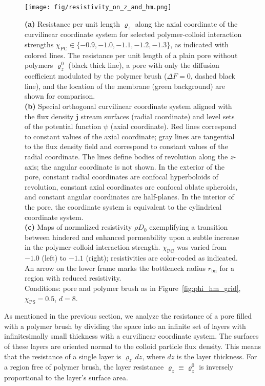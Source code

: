 \documentclass[12pt, a4paper]{article}
\begin{document}
\begin{figure}
    \centering
    \texttt{[image: fig/resistivity\_on\_z\_and\_hm.png]}
    \caption{
    \textbf{(a)} Resistance per unit length $\varrho_{z}$ along the axial coordinate of the curvilinear coordinate system for selected polymer-colloid interaction strengths $\chi_{\text{PC}} \in \{ -0.9, -1.0, -1.1, -1.2, -1.3\}$, as indicated with colored lines.
    The resistance per unit length of a plain pore without polymers $\varrho_{z}^{0}$ (black thick line), a pore with only the diffusion coefficient modulated by the polymer brush ($\Delta F = 0$, dashed black line), and the location of the membrane (green background) are shown for comparison.
    \\
    \textbf{(b)} Special orthogonal curvilinear coordinate system aligned with the flux density $\bm{j}$ stream surfaces (radial coordinate) and level sets of the potential function $\psi$ (axial coordinate).
    Red lines correspond to constant values of the axial coordinate; gray lines are tangential to the flux density field and correspond to constant values of the radial coordinate.
    The lines define bodies of revolution along the $z$-axis; the angular coordinate is not shown.
    In the exterior of the pore, constant radial coordinates are confocal hyperboloids of revolution, constant axial coordinates are confocal oblate spheroids, and constant angular coordinates are half-planes.
    In the interior of the pore, the coordinate system is equivalent to the cylindrical coordinate system.
    \\
    \textbf{(c)} Maps of normalized resistivity $\rho D_0$ exemplifying a transition between hindered and enhanced permeability upon a subtle increase in the polymer-colloid interaction strength.
    $\chi_{\text{PC}}$ was varied from $-1.0$ (left) to $-1.1$ (right); resistivities are color-coded as indicated.
    An arrow on the lower frame marks the bottleneck radius $r_{\text{bn}}$ for a region with reduced resistivity.\\
    Conditions: pore and polymer brush as in Figure~\ref{fig:phi_hm_grid}, $\chi_{\text{PS}}=0.5$, $d=8$.
    }
    \label{fig:R_map}
\end{figure}

As mentioned in the previous section, we analyze the resistance of a pore filled with a polymer brush by dividing the space into an infinite set of layers with infinitesimally small thickness with a curvilinear coordinate system.
The surfaces of these layers are oriented normal to the colloid particle flux density.
This means that the resistance of a single layer is $\varrho_{z} \, dz$, where $dz$ is the layer thickness.
For a region free of polymer brush, the layer resistance $\varrho_{z} \equiv \varrho_{z}^{0}$ is inversely proportional to the layer's surface area.
\end{document}
